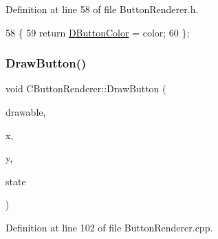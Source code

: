 Definition at line 58 of file Button\+Renderer.\+h.


\begin{DoxyCode}
58                                                     \{
59             \textcolor{keywordflow}{return} \hyperlink{classCButtonRenderer_a8b2bce7400657eb1a8f896b070d11996}{DButtonColor} = color;
60         \};
\end{DoxyCode}
\hypertarget{classCButtonRenderer_a9f29dd6d2243ddae58211706cc6b37b6}{}\label{classCButtonRenderer_a9f29dd6d2243ddae58211706cc6b37b6} 
\subsubsection{\texorpdfstring{Draw\+Button()}{DrawButton()}}
{\footnotesize\ttfamily void C\+Button\+Renderer\+::\+Draw\+Button (\begin{DoxyParamCaption}\item[{Gdk\+Drawable $\ast$}]{drawable,  }\item[{int}]{x,  }\item[{int}]{y,  }\item[{\hyperlink{classCButtonRenderer_ae0eccda184600f6e14bfd59033e5e9a1}{E\+Button\+State}}]{state }\end{DoxyParamCaption})}



Definition at line 102 of file Button\+Renderer.\+cpp.


